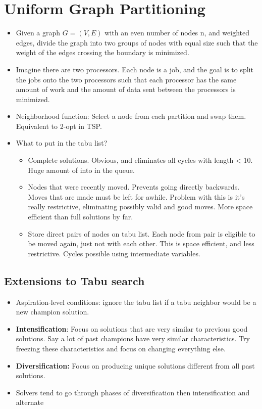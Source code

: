 \documentclass[12pt, letter]{article}
\begin{document}
\section{Uniform Graph Partitioning}%
\label{sec:uniform_graph_partitioning}
\begin{itemize}
	\item Given a graph $G=(V,E)$ with an even number of nodes n, and weighted edges, divide the graph into two groups of nodes with equal size such that the weight of the edges crossing the boundary is minimized.
	\item Imagine there are two processors. Each node is a job, and the goal is to split the jobs onto the two processors such that each processor has the same amount of work and the amount of data sent between the processors is minimized.
	\item Neighborhood function: Select a node from each partition and swap them. Equivalent to 2-opt in TSP.
	\item What to put in the tabu list?
	\begin{itemize}
		\item Complete solutions. Obvious, and eliminates all cycles with length < 10. Huge amount of into in the queue.
		\item Nodes that were recently moved. Prevents going directly backwards. Moves that are made must be left for awhile. Problem with this is it's really restrictive, eliminating possibly valid and good moves. More space efficient than full solutions by far.
		\item Store direct pairs of nodes on tabu list. Each node from pair is eligible to be moved again, just not with each other. This is space efficient, and less restrictive. Cycles possible using intermediate variables.
	\end{itemize}
\end{itemize}

\subsection*{Extensions to Tabu search}
\begin{itemize}
	\item Aspiration-level conditions: ignore the tabu list if a tabu neighbor would be a new champion solution.
	\item \textbf{Intensification}: Focus on solutions that are very similar to previous good solutions. Say a lot of past champions have very similar characteristics. Try freezing these characteristics and focus on changing everything else.
	\item \textbf{Diversification:} Focus on producing unique solutions different from all past solutions.
	\item Solvers tend to go through phases of diversification then intensification and alternate
\end{itemize}
\end{document}
